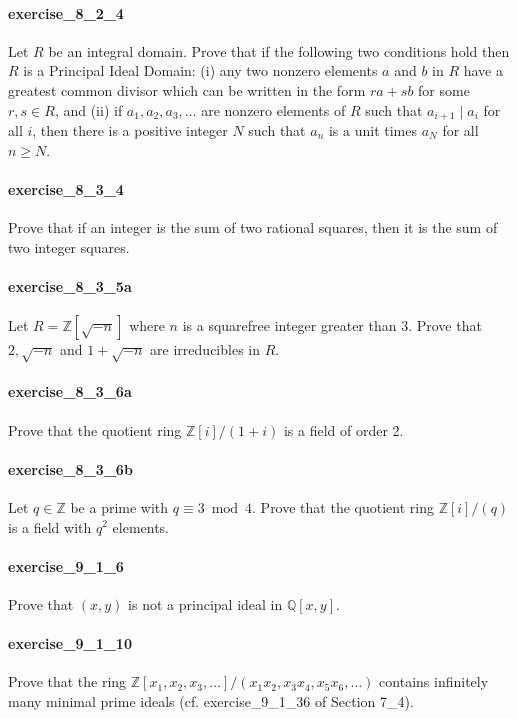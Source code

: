 \documentclass{article}
\begin{document}
\paragraph{exercise\_8\_2\_4} Let $R$ be an integral domain. Prove that if the following two conditions hold then $R$ is a Principal Ideal Domain: (i) any two nonzero elements $a$ and $b$ in $R$ have a greatest common divisor which can be written in the form $r a+s b$ for some $r, s \in R$, and (ii) if $a_{1}, a_{2}, a_{3}, \ldots$ are nonzero elements of $R$ such that $a_{i+1} \mid a_{i}$ for all $i$, then there is a positive integer $N$ such that $a_{n}$ is a unit times $a_{N}$ for all $n \geq N$.

\paragraph{exercise\_8\_3\_4} Prove that if an integer is the sum of two rational squares, then it is the sum of two integer squares.

\paragraph{exercise\_8\_3\_5a} Let $R=\mathbb{Z}[\sqrt{-n}]$ where $n$ is a squarefree integer greater than 3. Prove that $2, \sqrt{-n}$ and $1+\sqrt{-n}$ are irreducibles in $R$.

\paragraph{exercise\_8\_3\_6a} Prove that the quotient ring $\mathbb{Z}[i] /(1+i)$ is a field of order 2.

\paragraph{exercise\_8\_3\_6b} Let $q \in \mathbb{Z}$ be a prime with $q \equiv 3 \bmod 4$. Prove that the quotient ring $\mathbb{Z}[i] /(q)$ is a field with $q^{2}$ elements.

\paragraph{exercise\_9\_1\_6} Prove that $(x, y)$ is not a principal ideal in $\mathbb{Q}[x, y]$.

\paragraph{exercise\_9\_1\_10} Prove that the ring $\mathbb{Z}\left[x_{1}, x_{2}, x_{3}, \ldots\right] /\left(x_{1} x_{2}, x_{3} x_{4}, x_{5} x_{6}, \ldots\right)$ contains infinitely many minimal prime ideals (cf. exercise\_9\_1\_36 of Section 7\_4).
\end{document}
